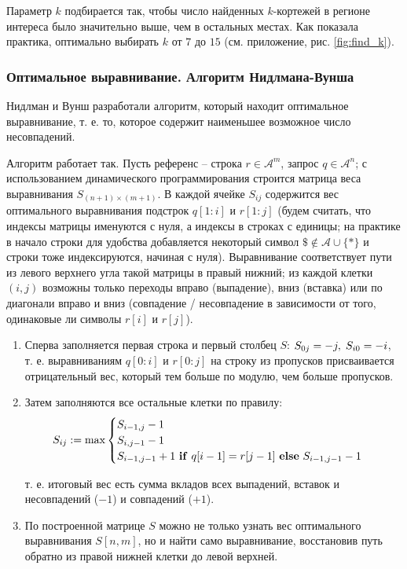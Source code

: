 \documentclass{main.tex}[subfiles]
\begin{document}
Параметр $k$ подбирается так, чтобы число найденных $k$-кортежей в регионе интереса было значительно выше, чем в остальных местах.
Как показала практика, оптимально выбирать $k$ от $7$ до $15$ (см. приложение, рис. \ref{fig:find_k}).

\subsubsection{Оптимальное выравнивание. Алгоритм Нидлмана-Вунша}

Нидлман и Вунш \cite{needleman1970} разработали алгоритм, который находит оптимальное выравнивание, т. е. то, которое содержит наименьшее возможное число несовпадений.

Алгоритм работает так.
Пусть референс -- строка $r \in \mathcal{A}^m $, запрос $q \in \mathcal{A}^n$; с использованием динамического программирования строится матрица веса выравнивания $S_{(n+1)\times (m+1)}$.
В каждой ячейке $S_{ij}$ содержится вес оптимального выравнивания подстрок $q[1:i]$ и $r[1:j]$ (будем считать, что индексы матрицы именуются с нуля, а индексы в строках с единицы; на практике в начало строки для удобства добавляется некоторый символ $ \$ \notin \mathcal{A} \cup \{ \ast \} $ и строки тоже индексируются, начиная с нуля). %
Выравнивание соответствует пути из левого верхнего угла такой матрицы в правый нижний; из каждой клетки $(i,j)$ возможны только переходы вправо (выпадение), вниз (вставка) или по диагонали вправо и вниз (совпадение / несовпадение в зависимости от того, одинаковые ли символы $r[i]$ и $r[j]$).
\begin{enumerate}
    \item Сперва заполняется первая строка и первый столбец $S$: $S_{0j} = -j, \thickspace S_{i0} = -i$, т. е. выравниваниям $q[0:i]$ и  $r[0:j]$ на строку из пропусков присваивается отрицательный вес, который тем больше по модулю, чем больше пропусков.
    \item Затем заполняются все остальные клетки по правилу:
    \[ S_{ij} := \max \begin{cases}
        S_{i-1,j} - 1 \\
        S_{i,j-1} - 1 \\
        S_{i-1,j-1} + 1 \text{ \textbf{if} } q[i-1] = r[j-1] \text{ \textbf{else} } S_{i-1,j-1} - 1
    \end{cases} \]

    т. е. итоговый вес есть сумма вкладов всех выпадений, вставок и несовпадений ($-1$) и совпадений ($+1$).
    \item По построенной матрице $ S $ можно не только узнать вес оптимального выравнивания $S[n,m]$, но и найти само выравнивание, восстановив путь обратно из правой нижней клетки до левой верхней.

\end{enumerate}
\end{document}
